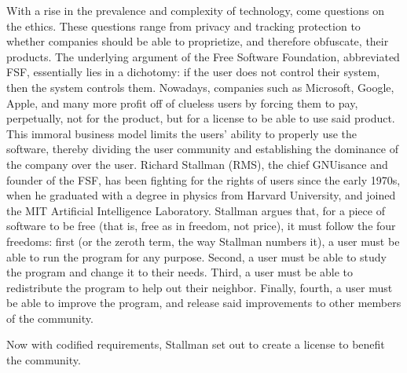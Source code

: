 \documentclass[12pt]{article}
\begin{document}
\begin{multicols}{3}

  With a rise in the prevalence and complexity of technology, come questions on the ethics. These questions range from privacy and tracking protection to whether companies should be able to proprietize, and therefore obfuscate, their products. The underlying argument of the Free Software Foundation, abbreviated FSF, essentially lies in a dichotomy: if the user does not control their system, then the system controls them. Nowadays, companies such as Microsoft, Google, Apple, and many more profit off of clueless users by forcing them to pay, perpetually, not for the product, but for a license to be able to use said product. This immoral business model limits the users' ability to properly use the software, thereby dividing the user community and establishing the dominance of the company over the user. Richard Stallman (RMS), the chief GNUisance and founder of the FSF, has been fighting for the rights of users since the early 1970s, when he graduated with a degree in physics from Harvard University, and joined the MIT Artificial Intelligence Laboratory.  Stallman argues that, for a piece of software to be free (that is, free as in freedom, not price), it must follow the four freedoms: first (or the zeroth term, the way Stallman numbers it), a user must be able to run the program for any purpose. Second, a user must be able to study the program and change it to their needs. Third, a user must be able to redistribute the program to help out their neighbor. Finally, fourth, a user must be able to improve the program, and release said improvements to other members of the community. 

  Now with codified requirements, Stallman set out to create a license to benefit the community.


  \vfill


\end{multicols}
\end{document}

